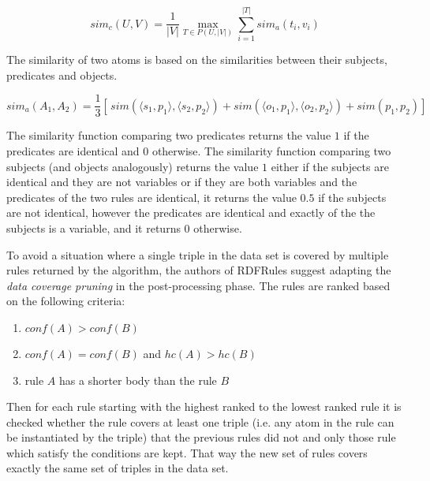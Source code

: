 $$sim_{c}(U,V) = \dfrac{1}{|V|} \max\limits_{T\in P(U,|V|)}\sum_{i = 1}^{|T|} sim_{a}(t_{i},v_{i})$$

The similarity of two atoms is based on the similarities between their subjects, predicates and objects.

$$sim_a(A_{1}, A_{2}) = \frac{1}{3} [ \, sim(\langle s_{1}, p_{1} \rangle, \langle s_{2}, p_{2} \rangle) + sim(\langle o_{1}, p_{1} \rangle, \langle o_{2}, p_{2} \rangle) + sim(p_{1}, p_{2}) ] \,$$

The similarity function comparing two predicates returns the value $1$ if the predicates are identical and $0$ otherwise. The similarity function comparing two subjects (and objects analogously) returns the value $1$ either if the subjects are identical and they are not variables or if they are both variables and the predicates of the two rules are identical, it returns the value $0.5$ if the subjects are not identical, however the predicates are identical and exactly of the the subjects is a variable, and it returns $0$ otherwise.

To avoid a situation where a single triple in the data set is covered by multiple rules returned by the algorithm, the authors of RDFRules suggest adapting the \textit{data coverage pruning} in the post-processing phase. The rules are ranked based on the following criteria:

\begin{enumerate}
    \item $conf(A) > conf(B)$
    \item $conf(A) = conf(B)$ and $hc(A) > hc(B)$
    \item rule $A$ has a shorter body than the rule $B$
\end{enumerate}

Then for each rule starting with the highest ranked to the lowest ranked rule it is checked whether the rule covers at least one triple (i.e. any atom in the rule can be instantiated by the triple) that the previous rules did not and only those rule which satisfy the conditions are kept. That way the new set of rules covers exactly the same set of triples in the data set.
